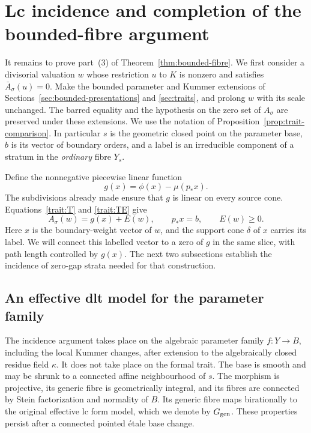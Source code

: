 \section{Lc incidence and completion of the bounded-fibre argument}
\label{sec:incidence}

It remains to prove part~(3) of Theorem~\ref{thm:bounded-fibre}.
We first consider a divisorial valuation $w$ whose restriction $u$ to $K$
is nonzero and satisfies $\bar A_\sigma(u)=0$.  Make the bounded parameter
and Kummer extensions of Sections~\ref{sec:bounded-presentations} and
\ref{sec:traits}, and prolong $w$ with its scale unchanged.  The barred
equality and the hypothesis on the zero set of $A_\sigma$ are preserved
under these extensions.  We use the notation of Proposition~\ref{prop:trait-comparison}.
In particular $s$ is the geometric closed point on the parameter base,
$b$ is its vector of boundary orders, and a label is an irreducible
component of a stratum in the \emph{ordinary} fibre $Y_s$.

Define the nonnegative piecewise linear function
\begin{equation}\label{inc:gap}
 g(x)=\phi(x)-\mu(p_*x).
\end{equation}
The subdivisions already made ensure that $g$ is linear on every source
cone.  Equations~\eqref{trait:T} and \eqref{trait:TE} give
\begin{equation}\label{inc:excess}
 A_\sigma(w)=g(x)+E(w),\qquad p_*x=b,
 \qquad E(w)\geq 0.
\end{equation}
Here $x$ is the boundary-weight vector of $w$, and the support cone
$\delta$ of $x$ carries its label.  We will connect this labelled
vector to a zero of $g$ in the same slice, with path length controlled
by $g(x)$.  The next two subsections establish the incidence of
zero-gap strata needed for that construction.

\subsection{An effective dlt model for the parameter family}

The incidence argument takes place on the algebraic parameter family
$f:Y\to B$, including the local Kummer changes, after extension to the
algebraically closed residue field $\kappa$.  It does not take place on
the formal trait.  The base is smooth and may be shrunk to a connected
affine neighbourhood of $s$.  The morphism is projective, its generic
fibre is geometrically integral, and its fibres are connected by Stein
factorization and normality of $B$.  Its generic fibre maps birationally
to the original effective lc form model, which we denote by $G_{\rm gen}$.
These properties persist after a connected pointed \'{e}tale base change.

